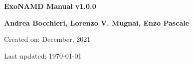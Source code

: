 

\begin{titlepage}

    \centering

    \vspace*{30mm} %
    \textbf{\Huge {ExoNAMD Manual v1.0.0}}


    \vspace{25mm}
    \Large \textbf{{Andrea Bocchieri, Lorenzo V. Mugnai, Enzo Pascale}}

    \vspace*{8mm}
    \small Created on: December, 2021

    \vspace{2mm}
    \small Last updated: \MonthYearFormat\today


\end{titlepage}

\clearpage
{}
\tableofcontents
\listoffigures
\listoftables
\clearpage
{}